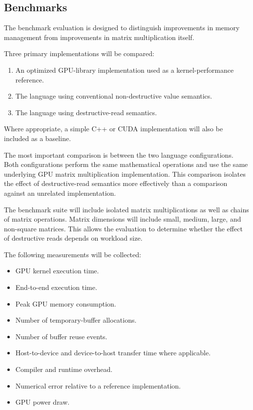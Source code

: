 \documentclass[a4paper]{article}
\begin{document}
	
	\subsection{Benchmarks}
	
	The benchmark evaluation is designed to distinguish improvements in memory management from improvements in matrix multiplication itself.
	
	Three primary implementations will be compared:
	
	\begin{enumerate}
		\item An optimized GPU-library implementation used as a kernel-performance reference.
		\item The language using conventional non-destructive value semantics.
		\item The language using destructive-read semantics.
	\end{enumerate}
	
	Where appropriate, a simple C++ or CUDA implementation will also be included as a baseline.
	
	The most important comparison is between the two language configurations. Both configurations perform the same mathematical operations and use the same underlying GPU matrix multiplication implementation. This comparison isolates the effect of destructive-read semantics more effectively than a comparison against an unrelated implementation.
	
	The benchmark suite will include isolated matrix multiplications as well as chains of matrix operations. Matrix dimensions will include small, medium, large, and non-square matrices. This allows the evaluation to determine whether the effect of destructive reads depends on workload size.
	
	The following measurements will be collected:
	
	\begin{itemize}
		\item GPU kernel execution time.
		\item End-to-end execution time.
		\item Peak GPU memory consumption.
		\item Number of temporary-buffer allocations.
		\item Number of buffer reuse events.
		\item Host-to-device and device-to-host transfer time where applicable.
		\item Compiler and runtime overhead.
		\item Numerical error relative to a reference implementation.
		\item GPU power draw.
	\end{itemize}
	
\end{document}
